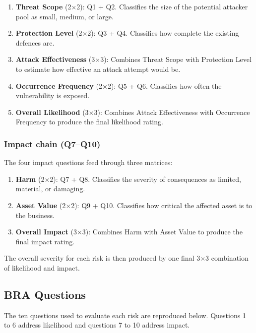 \begin{enumerate}
\item \textbf{Threat Scope} (2$\times$2): Q1 + Q2. Classifies the size of the potential attacker pool as small, medium, or large.
\item \textbf{Protection Level} (2$\times$2): Q3 + Q4. Classifies how complete the existing defences are.
\item \textbf{Attack Effectiveness} (3$\times$3): Combines Threat Scope with Protection Level to estimate how effective an attack attempt would be.
\item \textbf{Occurrence Frequency} (2$\times$2): Q5 + Q6. Classifies how often the vulnerability is exposed.
\item \textbf{Overall Likelihood} (3$\times$3): Combines Attack Effectiveness with Occurrence Frequency to produce the final likelihood rating.
\end{enumerate}

\subsubsection*{Impact chain (Q7--Q10)}

The four impact questions feed through three matrices:

\begin{enumerate}
\item \textbf{Harm} (2$\times$2): Q7 + Q8. Classifies the severity of consequences as limited, material, or damaging.
\item \textbf{Asset Value} (2$\times$2): Q9 + Q10. Classifies how critical the affected asset is to the business.
\item \textbf{Overall Impact} (3$\times$3): Combines Harm with Asset Value to produce the final impact rating.
\end{enumerate}

The overall severity for each risk is then produced by one final 3$\times$3 combination of likelihood and impact.

\subsection*{BRA Questions}

The ten questions used to evaluate each risk are reproduced below. Questions 1 to 6 address likelihood and questions 7 to 10 address impact.

